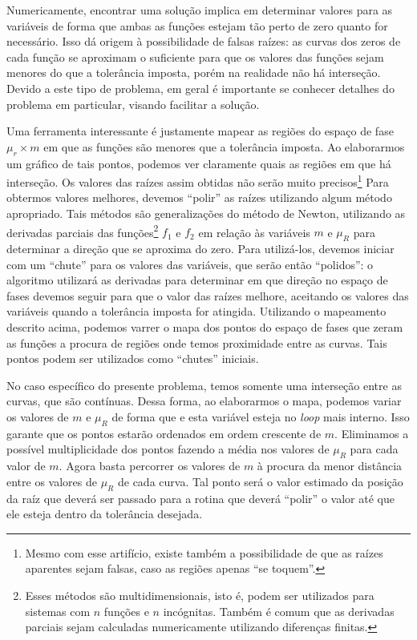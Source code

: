 Numericamente, encontrar uma solução implica em determinar valores para as variáveis de forma que ambas as funções estejam tão perto de zero quanto for necessário. Isso dá origem à possibilidade de falsas raízes: as curvas dos zeros de cada função se aproximam o suficiente para que os valores das funções sejam menores do que a tolerância imposta, porém na realidade não há interseção. Devido a este tipo de problema, em geral é importante se conhecer detalhes do problema em particular, visando facilitar a solução.

Uma ferramenta interessante é justamente mapear as regiões do espaço de fase $\mu_r \times m$ em que as funções são menores que a tolerância imposta. Ao elaborarmos um gráfico de tais pontos, podemos ver claramente quais as regiões em que há interseção. Os valores das raízes assim obtidas não serão muito precisos\footnote{Mesmo com esse artifício, existe também a possibilidade de que as raízes aparentes sejam falsas, caso as regiões apenas ``se toquem''.} Para obtermos valores melhores, devemos ``polir'' as raízes utilizando algum método apropriado. Tais métodos são generalizações do método de Newton\cite{NumericalRecipes}, utilizando as derivadas parciais das funções\footnote{Esses métodos são multidimensionais, isto é, podem ser utilizados para sistemas com $n$ funções e $n$ incógnitas. Também é comum que as derivadas parciais sejam calculadas numericamente utilizando diferenças finitas.} $f_1$ e $f_2$ em relação às variáveis $m$ e $\mu_R$ para determinar a direção que se aproxima do zero. Para utilizá-los, devemos iniciar com um ``chute'' para os valores das variáveis, que serão então ``polidos'': o algoritmo utilizará as derivadas para determinar em que direção no espaço de fases devemos seguir para que o valor das raízes melhore, aceitando os valores das variáveis quando a tolerância imposta for atingida. Utilizando o mapeamento descrito acima, podemos varrer o mapa dos pontos do espaço de fases que zeram as funções a procura de regiões onde temos proximidade entre as curvas. Tais pontos podem ser utilizados como ``chutes'' iniciais.

No caso específico do presente problema, temos somente uma interseção entre as curvas, que são contínuas. Dessa forma, ao elaborarmos o mapa, podemos variar os valores de $m$ e $\mu_R$ de forma que e esta variável esteja no \emph{loop} mais interno. Isso garante que os pontos estarão ordenados em ordem crescente de $m$. Eliminamos a possível multiplicidade dos pontos fazendo a média nos valores de $\mu_R$ para cada valor de $m$. Agora basta percorrer os valores de $m$ à procura da menor distância entre os valores de $\mu_R$ de cada curva. Tal ponto será o valor estimado da posição da raíz que deverá ser passado para a rotina que deverá ``polir'' o valor até que ele esteja dentro da tolerância desejada.

